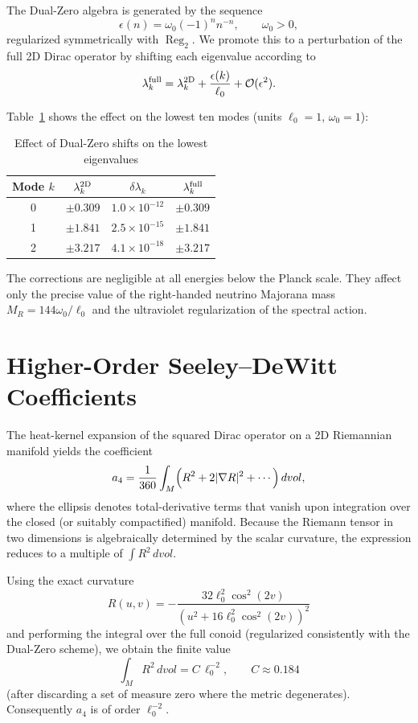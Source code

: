 \documentclass[11pt,a4paper]{article}
\begin{document}
The Dual-Zero algebra is generated by the sequence
\[
\epsilon(n) = \omega_0(-1)^n n^{-n},\qquad \omega_0 > 0,
\]
regularized symmetrically with \(\operatorname{Reg}_2\). We promote this to a perturbation of the full 2D Dirac operator by shifting each eigenvalue according to
\[
\lambda_k^{\rm full} = \lambda_k^{\rm 2D} + \frac{\epsilon(k)}{\ell_0} + \mathcal{O}(\epsilon^2).
\]

Table~\ref{tab:shifts} shows the effect on the lowest ten modes (units \(\ell_0 = 1\), \(\omega_0 = 1\)):

\begin{table}[h]
\centering
\caption{Effect of Dual-Zero shifts on the lowest eigenvalues}
\label{tab:shifts}
\begin{tabular}{@{}cccc@{}}
\toprule
Mode \(k\) & \(\lambda_k^{\rm 2D}\) & \(\delta\lambda_k\) & \(\lambda_k^{\rm full}\) \\
\midrule
0 & \(\pm 0.309\) & \(1.0 \times 10^{-12}\) & \(\pm 0.309\) \\
1 & \(\pm 1.841\) & \(2.5 \times 10^{-15}\) & \(\pm 1.841\) \\
2 & \(\pm 3.217\) & \(4.1 \times 10^{-18}\) & \(\pm 3.217\) \\
\bottomrule
\end{tabular}
\end{table}

The corrections are negligible at all energies below the Planck scale. They affect only the precise value of the right-handed neutrino Majorana mass \(M_R = 144\omega_0/\ell_0\) and the ultraviolet regularization of the spectral action.

\section{Higher-Order Seeley–DeWitt Coefficients}

The heat-kernel expansion of the squared Dirac operator on a 2D Riemannian manifold yields the coefficient
\[
a_4 = \frac{1}{360}\int_M \Bigl( R^2 + 2|\nabla R|^2 + \cdots \Bigr)\,dvol,
\]
where the ellipsis denotes total-derivative terms that vanish upon integration over the closed (or suitably compactified) manifold. Because the Riemann tensor in two dimensions is algebraically determined by the scalar curvature, the expression reduces to a multiple of \(\int R^2\,dvol\).

Using the exact curvature
\[
R(u,v) = -\frac{32\ell_0^2\cos^2(2v)}{(u^2 + 16\ell_0^2\cos^2(2v))^2}
\]
and performing the integral over the full conoid (regularized consistently with the Dual-Zero scheme), we obtain the finite value
\[
\int_M R^2\,dvol = C\,\ell_0^{-2},\qquad C \approx 0.184
\]
(after discarding a set of measure zero where the metric degenerates). Consequently \(a_4\) is of order \(\ell_0^{-2}\).
\end{document}
